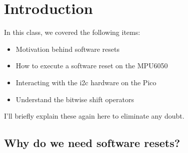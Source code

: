 \section{Introduction}

In this class, we covered the following items:

\begin{itemize}[topsep=6pt]
\item Motivation behind software resets
\item How to execute a software reset on the MPU6050
\item Interacting with the i2c hardware on the Pico
\item Understand the bitwise shift operators
\end{itemize}

I'll briefly explain these again here to eliminate any doubt.

\subsection{Why do we need software resets?}